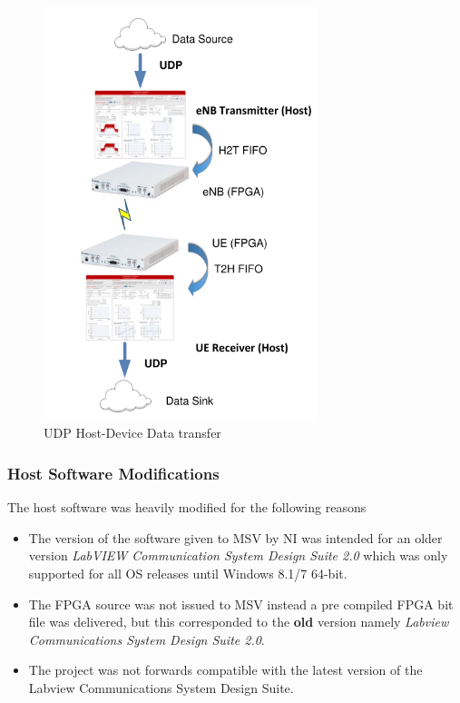 \begin{figure}[H]
    \centering
    \includegraphics[width=8cm]{images/UDPDataTransfer.png}
    \caption{UDP Host-Device Data transfer}
    \label{fig:UDPDataTransfer}
\end{figure}

\subsubsection{Host Software Modifications}\label{ssec:LTEAFWHostSWMods}
The host software was heavily modified for the following reasons

\begin{itemize}
    \item The version of the software given to MSV by NI was intended for an older version \textit{LabVIEW Communication System Design Suite 2.0} which was only supported for all OS releases until Windows 8.1/7 64-bit.

    \item The FPGA source was not issued to MSV instead a pre compiled FPGA bit file was delivered, but this corresponded to the \textbf{old} version namely \textit{Labview Communications System Design Suite 2.0}.

    \item The project was not forwards compatible with the latest version of the Labview Communications System Design Suite.
\end{itemize}

